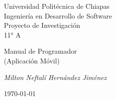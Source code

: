 \begin{center}
{\Large Universidad Politécnica de Chiapas}\\
Ingeniería en Desarrollo de Software\\
Proyecto de Investigación\\
11° A\\

\vfill

{\Huge Manual de Programador \\ (Aplicación Móvil)}

\vspace{0.5cm}
{\Large \textsl{Milton Neftalí Hernández Jiménez}}


\vfill
\today
\end{center}